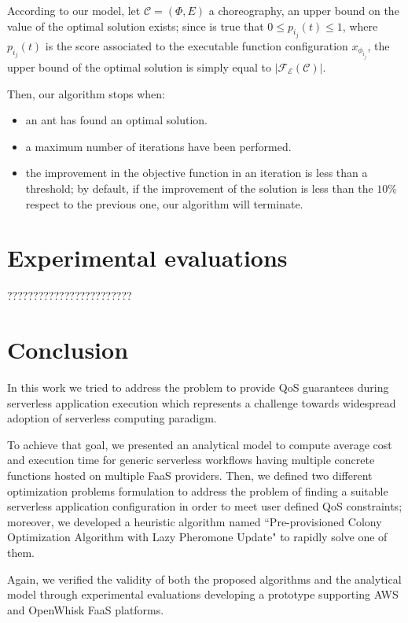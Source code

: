 \documentclass[12pt,a4paper]{report}
\newcommand{\QuoteIntro}{``}
\begin{document}
According to our model, let $\mathcal{C} = (\Phi,E)$ a choreography, an upper bound on the value of the optimal solution exists; since is true that $0 \leq p_{i_j}(t) \leq 1$, where $p_{i_j}(t)$ is the score associated to the executable function configuration $x_{\phi_{i_j}}$, the upper bound of the optimal solution is simply equal to $|\mathscr{F_E}(\mathcal{C})|$.

Then, our algorithm stops when:

\begin{itemize}
	\item an ant has found an optimal solution.
	\item a maximum number of iterations have been performed.
	\item the improvement in the objective function in an iteration is less than a threshold; by default, if the improvement of the solution is less than the $10\%$ respect to the previous one, our algorithm will terminate.
\end{itemize}


\newpage

\chapter{Experimental evaluations}\label{chapterExperimental}

????????????????????????

\chapter{Conclusion}\label{chapterConclusion}

In this work we tried to address the problem to provide QoS guarantees during serverless application execution which represents a challenge towards widespread adoption of serverless computing paradigm.

To achieve that goal, we presented an analytical model to compute average cost and execution time for generic serverless workflows having multiple concrete functions hosted on multiple FaaS providers. Then, we defined two different optimization problems formulation to address the problem of finding a suitable serverless application configuration in order to meet user defined QoS constraints; moreover, we developed a heuristic algorithm named \QuoteIntro Pre-provisioned Colony Optimization Algorithm with Lazy Pheromone Update" to rapidly solve one of them. 

Again, we verified the validity of both the proposed algorithms and the analytical model through experimental evaluations developing a prototype supporting AWS and OpenWhisk FaaS platforms.
\end{document}
